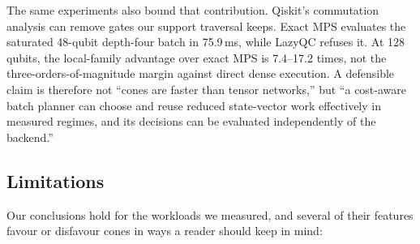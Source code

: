 The same experiments also bound that contribution. Qiskit's commutation analysis can remove gates our support traversal keeps. Exact MPS evaluates the saturated 48-qubit depth-four batch in 75.9\,ms, while LazyQC refuses it. At 128 qubits, the local-family advantage over exact MPS is 7.4--17.2 times, not the three-orders-of-magnitude margin against direct dense execution. A defensible claim is therefore not ``cones are faster than tensor networks,'' but ``a cost-aware batch planner can choose and reuse reduced state-vector work effectively in measured regimes, and its decisions can be evaluated independently of the backend.''

\subsection{Limitations}
Our conclusions hold for the workloads we measured, and several of their features favour or disfavour cones in ways a reader should keep in mind:
